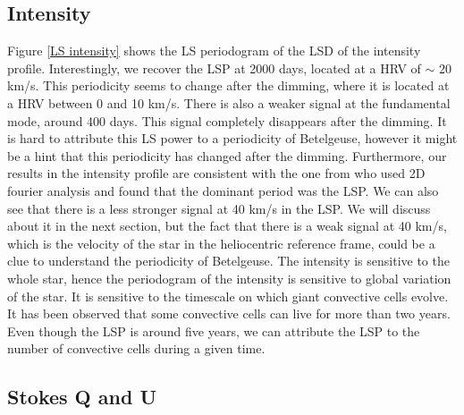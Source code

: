 \documentclass{aa}
\begin{document}
\subsection{Intensity}
Figure \ref{LS intensity} shows the LS periodogram of the LSD of the intensity profile. Interestingly, we recover the LSP at 2000 days, 
located at a HRV of $\sim$ 20 km/s. This periodicity seems to change after the dimming, where it is located at a HRV between 0 and 10 km/s. 
There is also a weaker signal at the fundamental mode, around 400 days. This signal completely disappears after the dimming. It is hard to attribute 
this LS power to a periodicity of Betelgeuse, however it might be a hint that this periodicity has changed after the dimming. Furthermore, our results 
in the intensity profile are consistent with the one from \cite{Mathias2018} who used 2D fourier analysis and found that the dominant period was the LSP. 
We can also see that there is a less stronger signal at 40 km/s in the LSP. We will discuss about it in the next section, but the fact that there is a weak 
signal at 40 km/s, which is the velocity of the star in the heliocentric reference frame, could be a clue to understand the periodicity of Betelgeuse. 
The intensity is sensitive to the whole star, hence the periodogram of the intensity is sensitive to global variation of the star. It is sensitive to 
the timescale on which giant convective cells evolve. It has been observed that some convective cells can live for more than two years. Even though the
LSP is around five years, we can attribute the LSP to the number of convective cells during a given time. 


\subsection{Stokes Q and U}
\end{document}

